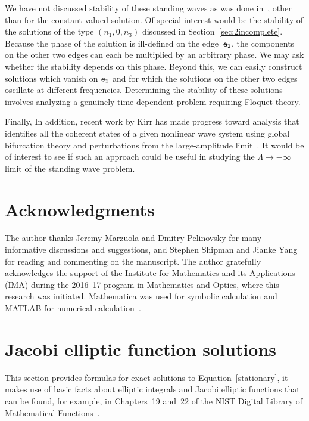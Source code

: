 \documentclass{article}
\numberwithin{equation}{section}
\numberwithin{figure}{section}
\begin{document}
We have not discussed stability of these standing waves as was done in~\cite{Noja:2015hx}, other than for the constant valued solution. Of special interest would be the stability of the solutions of the type $(n_1,0,n_3)$ discussed in Section~\ref{sec:2incomplete}. Because the phase of the solution is ill-defined on the edge~$\mathtt{e}_2$, the components on the other two edges can each be multiplied by an arbitrary phase. We may ask whether the stability depends on this phase. Beyond this, we can easily construct solutions which vanish on $\mathtt{e}_2$ and for which the solutions on the other two edges oscillate at different frequencies. Determining the stability of these solutions involves analyzing a genuinely time-dependent problem requiring Floquet theory.

Finally, In addition, recent work by Kirr has made progress toward analysis that identifies all the coherent states of a given nonlinear wave system using global bifurcation theory and perturbations from the large-amplitude limit~\cite{Kirr:2017}. It would be of interest to see if such an approach could be useful in studying the $\Lambda \to -\infty$ limit of the standing wave problem.

\section*{Acknowledgments}
The author thanks Jeremy Marzuola and Dmitry Pelinovsky for many informative discussions and suggestions, and Stephen Shipman and Jianke Yang for reading and commenting on the manuscript. The author gratefully acknowledges the support of the Institute for Mathematics and its Applications (IMA) during the 2016--17 program in Mathematics and Optics, where this research was initiated. Mathematica was used for symbolic calculation and MATLAB for numerical calculation~\cite{Mathematica,matlab}.

\appendix
\section{Jacobi elliptic function solutions}
\label{sec:cnoidal}

This section provides formulas for exact solutions to Equation~\eqref{stationary}, it makes use of basic facts about elliptic integrals and Jacobi elliptic functions that can be found, for example, in Chapters~19 and~22 of the NIST Digital Library of Mathematical Functions~\cite{NIST:DLMF}.
\end{document}
